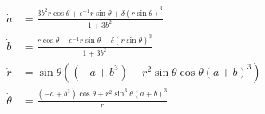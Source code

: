 \documentclass[11pt,reqno]{amsart}
\begin{document}

\begin{equation}
\begin{split}
\dot{a} &= \frac{ 3b^2 r\cos\theta  +\epsilon^{-1}r\sin\theta + \delta \left( r\sin\theta\right)^3}{1+3b^2}\\
\dot{b}&= \frac{ r\cos\theta -\epsilon^{-1}r\sin\theta - \delta \left( r\sin\theta\right)^3}{1+3b^2}\\
\dot{r} &=\sin\theta\left( \left( -a + b^3\right) - r^2\sin\theta\cos\theta( a + b)^3\right)\\
\dot{\theta} &= \frac{\left( -a + b^3\right)\cos\theta + r^2\sin^3\theta( a + b)^3}{r}\\
\end{split}
\end{equation}

\end{document}
